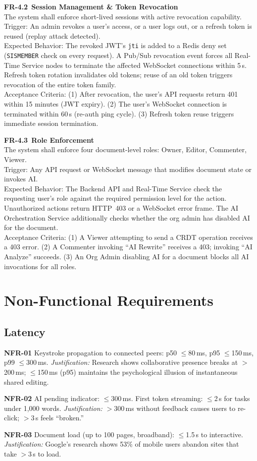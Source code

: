 \documentclass[10pt, a4paper]{article}
\newcommand{\requirement}[1]{\textcolor{accent}{\textsf{\textbf{#1}}}}
\newcommand{\lightrule}{{\color{border}\rule{\textwidth}{0.4pt}}}
\newcommand{\frcard}[6]{%
\vspace{4pt}
\noindent\begin{minipage}{\textwidth}
\noindent\requirement{#1}~\textbf{#2}\\[2pt]
{\small\color{inkSoft}#3}\\[3pt]
{\small\color{inkMuted}\textsf{Trigger:}} {\small #4}\\[1pt]
{\small\color{inkMuted}\textsf{Expected Behavior:}} {\small #5}\\[1pt]
{\small\color{inkMuted}\textsf{Acceptance Criteria:}} {\small #6}
\end{minipage}
\vspace{4pt}\lightrule\vspace{2pt}
}
\begin{document}
\frcard{FR-4.2}{Session Management \& Token Revocation}{The system shall enforce short-lived sessions with active revocation capability.}{An admin revokes a user's access, or a user logs out, or a refresh token is reused (replay attack detected).}{The revoked JWT's \texttt{jti} is added to a Redis deny set (\texttt{SISMEMBER} check on every request). A Pub/Sub revocation event forces all Real-Time Service nodes to terminate the affected WebSocket connections within 5\,s. Refresh token rotation invalidates old tokens; reuse of an old token triggers revocation of the entire token family.}{(1) After revocation, the user's API requests return 401 within 15 minutes (JWT expiry). (2) The user's WebSocket connection is terminated within 60\,s (re-auth ping cycle). (3) Refresh token reuse triggers immediate session termination.}

\frcard{FR-4.3}{Role Enforcement}{The system shall enforce four document-level roles: Owner, Editor, Commenter, Viewer.}{Any API request or WebSocket message that modifies document state or invokes AI.}{The Backend API and Real-Time Service check the requesting user's role against the required permission level for the action. Unauthorized actions return HTTP~403 or a WebSocket error frame. The AI Orchestration Service additionally checks whether the org admin has disabled AI for the document.}{(1) A Viewer attempting to send a CRDT operation receives a 403 error. (2) A Commenter invoking ``AI Rewrite'' receives a 403; invoking ``AI Analyze'' succeeds. (3) An Org Admin disabling AI for a document blocks all AI invocations for all roles.}


\section{Non-Functional Requirements}

\subsection{Latency}
\begin{speclist}
\item \requirement{NFR-01} Keystroke propagation to connected peers: p50 $\le$80\,ms, p95 $\le$150\,ms, p99 $\le$300\,ms. \textit{Justification:} Research shows collaborative presence breaks at $>$200\,ms; $\le$150\,ms (p95) maintains the psychological illusion of instantaneous shared editing.
\item \requirement{NFR-02} AI pending indicator: $\le$300\,ms. First token streaming: $\le$2\,s for tasks under 1,000 words. \textit{Justification:} $>$300\,ms without feedback causes users to re-click; $>$3\,s feels ``broken.''
\item \requirement{NFR-03} Document load (up to 100 pages, broadband): $\le$1.5\,s to interactive. \textit{Justification:} Google's research shows 53\% of mobile users abandon sites that take $>$3\,s to load.
\end{speclist}
\end{document}
